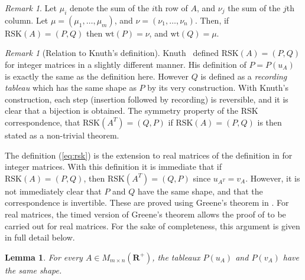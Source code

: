 \documentclass[10pt]{amsproc}
\newtheorem{lemma}[theorem]{Lemma}
\theoremstyle{definition}
\theoremstyle{remark}
\newtheorem{remark}[theorem]{Remark}
\newcommand{\wt}{\mathrm{wt}}
\newcommand{\rp}{\mathbf{R}^+}
\newcommand{\rsk}{\mathrm{RSK}}
\begin{document}
\begin{remark}
  Let $\mu_i$ denote the sum of the $i$th row of $A$, and $\nu_j$ the sum of the $j$th column.
  Let $\mu=(\mu_1,\dotsc,\mu_m)$, and $\nu=(\nu_1,\dotsc,\nu_n)$.
  Then, if $\rsk(A)=(P,Q)$ then $\wt(P)=\nu$, and $\wt(Q)=\mu$.
\end{remark}
\begin{remark}[Relation to Knuth's definition]
  Knuth~\cite{knuth} defined $\rsk(A)=(P,Q)$ for integer matrices in a slightly different manner.
  His definition of $P=P(u_A)$ is exactly the same as the definition here.
  However $Q$ is defined as a \emph{recording tableau} which has the same shape as $P$ by its very construction.
  With Knuth's construction, each step (insertion followed by recording) is reversible, and it is clear that a bijection is obtained.
  The symmetry property of the RSK correspondence, that $\rsk(A^T)=(Q,P)$ if $\rsk(A)=(P,Q)$ is then stated as a non-trivial theorem.

  The definition (\ref{eq:rsk}) is the extension to real matrices of the definition in \cite[Section~18]{schur_poly} for integer matrices.
  With this definition it is immediate that if $\rsk(A)=(P,Q)$, then $\rsk(A^T)=(Q,P)$ since $u_{A^T}=v_A$.
  However, it is not immediately clear that $P$ and $Q$ have the same shape, and that the correspondence is invertible.
  These are proved using Greene's theorem in \cite{schur_poly}.
  For real matrices, the timed version of Greene's theorem allows the proof of \cite{schur_poly} to be carried out for real matrices.
  For the sake of completeness, this argument is given in full detail below.
\end{remark}
\begin{lemma}
  \label{lemma:same-shape}
  For every $A\in M_{m\times n}(\rp)$, the tableaux $P(u_A)$ and $P(v_A)$ have the same shape.
\end{lemma}
\end{document}
